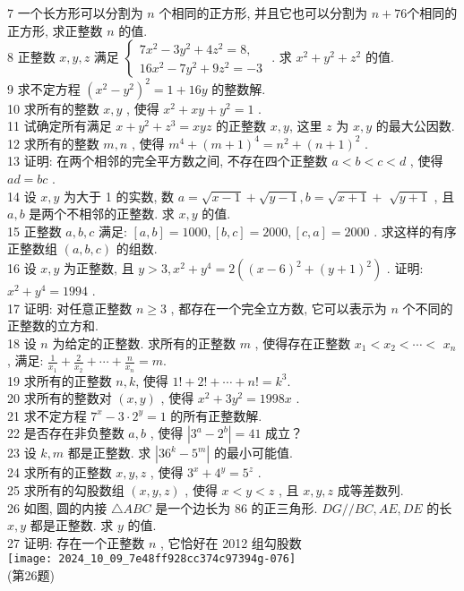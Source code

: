 	7 一个长方形可以分割为 $n$ 个相同的正方形, 并且它也可以分割为 $n+76$个相同的正方形, 求正整数 $n$ 的值. \\
	8 正整数 $x ,  y ,  z$ 满足 $\left\{\begin{array}{l}7 x^{2}-3 y^{2}+4 z^{2}=8, \\ 16 x^{2}-7 y^{2}+9 z^{2}=-3\end{array}\right.$ .  求 $x^{2}+y^{2}+z^{2}$ 的值.\\
	9 求不定方程 $\left(x^{2}-y^{2}\right)^{2}=1+16 y$ 的整数解. \\
	10 求所有的整数 $x ,  y$ , 使得 $x^{2}+x y+y^{2}=1$ . \\
	11 试确定所有满足 $x+y^{2}+z^{3}=x y z$ 的正整数 $x ,  y$, 这里 $z$ 为 $x ,  y$ 的最大公因数.\\
	12 求所有的整数 $m ,  n$ , 使得 $m^{4}+(m+1)^{4}=n^{2}+(n+1)^{2}$ . \\
	13 证明: 在两个相邻的完全平方数之间, 不存在四个正整数 $a<b<c<d$ , 使得 $a d=b c$ . \\
	14 设 $x ,  y$ 为大于 1 的实数, 数 $a=\sqrt{x-1}+\sqrt{y-1}, b=\sqrt{x+1}+$ $\sqrt{y+1}$ , 且 $a ,  b$ 是两个不相邻的正整数. 求 $x ,  y$ 的值.\\
	15 正整数 $a ,  b ,  c$ 满足:  $[a, b]=1000,[b, c]=2000,[c, a]=2000$ . 求这样的有序正整数组 $(a, b, c)$ 的组数. \\
	16 设 $x ,  y$ 为正整数, 且 $y>3 ,  x^{2}+y^{4}=2\left((x-6)^{2}+(y+1)^{2}\right)$ . 证明:  $x^{2}+y^{4}=1994$ . \\
	17 证明: 对任意正整数 $n \geqslant 3$ , 都存在一个完全立方数, 它可以表示为 $n$ 个不同的正整数的立方和. \\
	18 设 $n$ 为给定的正整数. 求所有的正整数 $m$ , 使得存在正整数 $x_{1}<x_{2}<\cdots<$ $x_{n}$ , 满足:  $\frac{1}{x_{1}}+\frac{2}{x_{2}}+\cdots+\frac{n}{x_{n}}=m . $\\
	19 求所有的正整数 $n ,  k$, 使得 $1!+2!+\cdots+n!=k^{3}$.\\
	20 求所有的整数对 $(x, y)$ , 使得 $x^{2}+3 y^{2}=1998 x$ . \\
	21 求不定方程 $7^{x}-3 \cdot 2^{y}=1$ 的所有正整数解. \\
	22 是否存在非负整数 $a ,  b$ , 使得 $\left|3^{a}-2^{b}\right|=41$ 成立？\\
	23 设 $k ,  m$ 都是正整数. 求 $\left|36^{k}-5^{m}\right|$ 的最小可能值.\\
	24 求所有的正整数 $x ,  y ,  z$ , 使得 $3^{x}+4^{y}=5^{z}$ . \\
	25 求所有的勾股数组 $(x, y, z)$ , 使得 $x<y<z$ , 且 $x ,  y ,  z$ 成等差数列. \\
	26 如图, 圆的内接 $\triangle A B C$ 是一个边长为 86 的正三角形. $D G / / B C, A E ,  D E$ 的长 $x ,  y$ 都是正整数. 求 $y$ 的值.\\
	27 证明: 存在一个正整数 $n$ , 它恰好在 2012 组勾股数\\
	\texttt{[image: 2024\_10\_09\_7e48ff928cc374c97394g-076]}\\
	(第26题)

